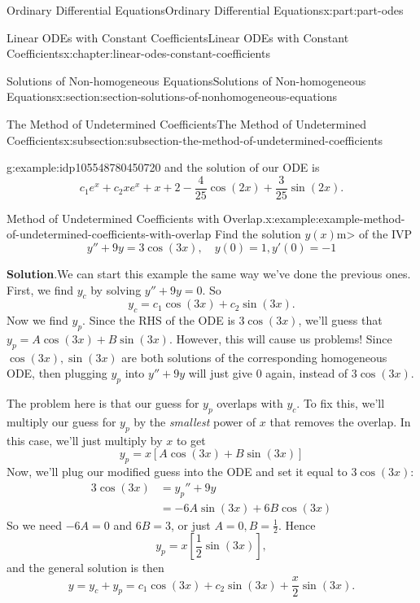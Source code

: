 \documentclass[oneside,10pt,]{book}
\newcommand{\blocktitlefont}{\relax}
\numberwithin{equation}{part}
\newcommand{\amp}{&}
\begin{document}
\begin{partptx}{Ordinary Differential Equations}{}{Ordinary Differential Equations}{}{}{x:part:part-odes}
\begin{chapterptx}{Linear ODEs with Constant Coefficients}{}{Linear ODEs with Constant Coefficients}{}{}{x:chapter:linear-odes-constant-coefficients}
\begin{sectionptx}{Solutions of Non-homogeneous Equations}{}{Solutions of Non-homogeneous Equations}{}{}{x:section:section-solutions-of-nonhomogeneous-equations}
\begin{subsectionptx}{The Method of Undetermined Coefficients}{}{The Method of Undetermined Coefficients}{}{}{x:subsection:subsection-the-method-of-undetermined-coefficients}
\begin{example}{}{g:example:idp105548780450720}
and the solution of our ODE is%
\begin{equation*}
c_{1}e^{x} + c_{2}xe^{x} + x + 2 - \frac{4}{25}\cos(2x) + \frac{3}{25}\sin(2x).
\end{equation*}
%
\end{example}
\begin{example}{Method of Undetermined Coefficients with Overlap.}{x:example:example-method-of-undetermined-coefficients-with-overlap}%
Find the solution \(y(x)\)m\textgreater{} of the IVP%
\begin{equation*}
y''+9y = 3\cos(3x),\quad y(0) = 1,y'(0) = -1
\end{equation*}
%
\par\smallskip%
\noindent\textbf{\blocktitlefont Solution}.\hypertarget{g:solution:idp105548780466848}{}\quad{}We can start this example the same way we've done the previous ones. First, we find \(y_{c}\) by solving \(y''+9y=0\). So%
\begin{equation*}
y_{c} = c_{1}\cos(3x)+c_{2}\sin(3x).
\end{equation*}
Now we find \(y_{p}\). Since the RHS of the ODE is \(3\cos(3x)\), we'll guess that \(y_{p} = A\cos(3x)+B\sin(3x)\). However, this will cause us problems! Since \(\cos(3x),\sin(3x)\) are both solutions of the corresponding homogeneous ODE, then plugging \(y_{p}\) into \(y''+9y\) will just give \(0\) again, instead of \(3\cos(3x)\).%
\par
The problem here is that our guess for \(y_{p}\) overlaps with \(y_{c}\). To fix this, we'll multiply our guess for \(y_{p}\) by the \emph{smallest} power of \(x\) that removes the overlap. In this case, we'll just multiply by \(x\) to get%
\begin{equation*}
y_{p} = x[A\cos(3x)+B\sin(3x)]
\end{equation*}
Now, we'll plug our modified guess into the ODE and set it equal to \(3\cos(3x)\):%
\begin{align*}
3\cos(3x)\amp = y_{p}'' + 9y\\
\amp = -6A\sin(3x)+6B\cos(3x)
\end{align*}
So we need \(-6A = 0\) and \(6B = 3\), or just \(A = 0,B = \frac{1}{2}\). Hence%
\begin{equation*}
y_{p} = x\left[\frac{1}{2}\sin(3x)\right],
\end{equation*}
and the general solution is then%
\begin{equation*}
y = y_{c}+y_{p} = c_{1}\cos(3x)+c_{2}\sin(3x) + \frac{x}{2}\sin(3x).
\end{equation*}

\end{example}
\end{subsectionptx}
\end{sectionptx}
\end{chapterptx}
\end{partptx}
\end{document}
